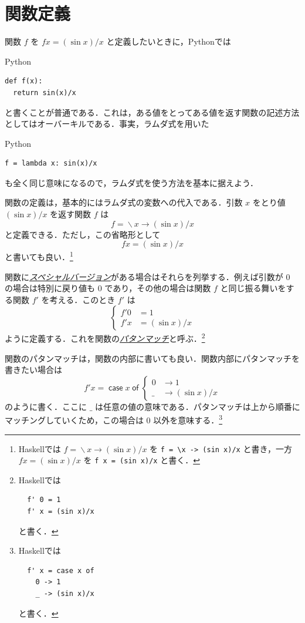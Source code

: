 \documentclass[a4paper]{jsbook}
\newcommand{\programminglanguage}[1]{\textsf{#1}}
\newcommand{\haskell}{\programminglanguage{Haskell}}
\newcommand{\python}{\programminglanguage{Python}}
\newcommand{\keyword}[1]{{\underline{\emph{#1}}}}
\newcommand{\code}[1]{\texttt{#1}}
\newenvironment{pythoncode}{\begin{itembox}[r]{\python}}{\end{itembox}}
\newcommand{\mKeyword}[1]{\mathsf{#1}}
\newcommand{\mCaseKeyword}{\mKeyword{case}}
\newcommand{\mOfKeyword}{\mKeyword{of}}
\newcommand{\mAnyParameter}{\_}
\DeclareMathOperator{\mLambda}{\backslash}
\DeclareMathOperator{\mLambdaArrow}{\rightarrow}
\DeclareMathOperator{\mCase}{\mCaseKeyword} %
\DeclareMathOperator{\mOf}{\mOfKeyword} %
\newcommand{\mCaseOf}[1]{\mCase{#1}\mOf}
\newcommand{\mLambdaExp}[2]{\mLambda{#1}\mLambdaArrow{#2}}
\begin{document}
\section{関数定義}

関数 $f$ を $fx=(\sin x)/x$ と定義したいときに，\python では
\begin{pythoncode}
\begin{verbatim}
def f(x):
  return sin(x)/x
\end{verbatim}
\end{pythoncode}
と書くことが普通である．これは，ある値をとってある値を返す関数の記述方法としてはオーバーキルである．事実，ラムダ式を用いた
\begin{pythoncode}
\begin{verbatim}
f = lambda x: sin(x)/x
\end{verbatim}
\end{pythoncode}
も全く同じ意味になるので，ラムダ式を使う方法を基本に据えよう．

関数の定義は，基本的にはラムダ式の変数への代入である．引数 $x$ をとり値 $(\sin x)/x$ を返す関数 $f$ は
\begin{equation}
f=\mLambdaExp{x}{(\sin x)/x}
\end{equation}
と定義できる．ただし，この省略形として
\begin{equation}
fx=(\sin x)/x
\end{equation}
と書いても良い．\footnote{\haskell では $f=\mLambdaExp{x}{(\sin x)/x}$ を \code{f = \textbackslash x -> (sin x)/x} と書き，一方 $fx=(\sin x)/x$ を \code{f x = (sin x)/x} と書く．}

関数に\keyword{スペシャルバージョン}がある場合はそれらを列挙する．例えば引数が $0$ の場合は特別に戻り値も $0$ であり，その他の場合は関数 $f$ と同じ振る舞いをする関数 $f'$ を考える．このとき $f'$ は
\begin{equation}
\left\{
\begin{split}
f'0&=1\\
f'x&=(\sin x)/x
\end{split}
\right.
\end{equation}
ように定義する．これを関数の\keyword{パタンマッチ}と呼ぶ．\footnote{\haskell では
\begin{verbatim}
  f' 0 = 1
  f' x = (sin x)/x
\end{verbatim}
と書く．}

関数のパタンマッチは，関数の内部に書いても良い．関数内部にパタンマッチを書きたい場合は
\begin{equation}
f'x=\mCaseOf{x}\left\{
\begin{split}
0&\rightarrow1\\
\mAnyParameter&\rightarrow(\sin x)/x
\end{split}
\right.
\end{equation}
のように書く．ここに $\mAnyParameter$ は任意の値の意味である．パタンマッチは上から順番にマッチングしていくため，この場合は $0$ 以外を意味する．\footnote{\haskell では
\begin{verbatim}
  f' x = case x of
    0 -> 1
    _ -> (sin x)/x
\end{verbatim}
と書く．}
\end{document}
